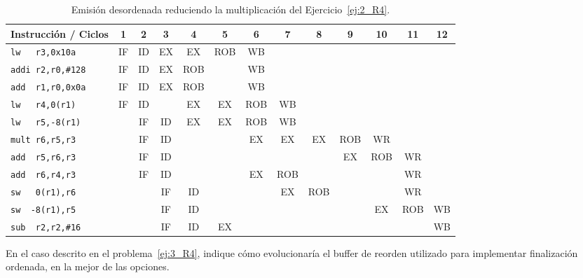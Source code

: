 \begin{ejercicio}
    \begin{table}
        \centering
        \scriptsize
        \begin{tabular}{|l|c|c|c|c|c|c|c|c|c|c|c|c|}
            \hline
            Instrucción / Ciclos & 1 & 2 & 3 & 4 & 5 & 6 & 7 & 8 & 9 & 10 & 11 & 12 \\
            \hline
            \verb|lw   r3,0x10a|        & IF & ID & EX & EX & ROB & WB & & & & & &\\
            \hline        
            \verb|addi r2,r0,#128|      & IF & ID & EX & ROB & & WB & & & & & &\\
            \hline           
            \verb|add  r1,r0,0x0a|      & IF & ID & EX & ROB & &  WB & & & & & & \\
            \hline                        
            \verb|lw   r4,0(r1)|        & IF & ID & & EX & EX & ROB & WB & & & & & \\
            \hline            
            \verb|lw   r5,-8(r1)|       & & IF & ID & EX & EX & ROB & WB & & & && \\
            \hline
            \verb|mult r6,r5,r3|        & & IF & ID & & & EX & EX & EX & ROB & WR & & \\
            \hline
            \verb|add  r5,r6,r3|        & & IF & ID & & & & & & EX & ROB & WR & \\
            \hline
            \verb|add  r6,r4,r3|        & & IF & ID & & & EX & ROB & & & & WR &\\
            \hline            
            \verb|sw   0(r1),r6|        & & & IF & ID & & & EX & ROB & & & WR & \\
            \hline
            \verb|sw  -8(r1),r5|        & & & IF & ID & & & & & & EX & ROB & WB\\
            \hline
            \verb|sub  r2,r2,#16|       & & & IF & ID & EX & & & & & & & WB \\
            \hline
        \end{tabular}
        \caption{Emisión desordenada reduciendo la multiplicación del Ejercicio~\ref{ej:2_R4}.}
        \label{tab:ej3_R4_2}
    \end{table}
\end{ejercicio}

\begin{ejercicio}
    En el caso descrito en el problema~\ref{ej:3_R4}, indique cómo evolucionaría el buffer de reorden utilizado para implementar finalización ordenada, en la mejor de las opciones. 
\end{ejercicio}

